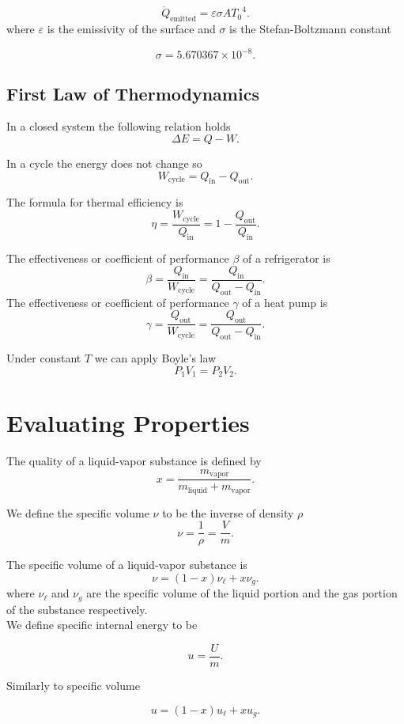 \documentclass{report}
\begin{document}
\[
	\dot{Q}_\text{emitted} = \varepsilon\sigma A{T_0}^4
	.\]
where $\varepsilon$ is the emissivity of the surface and $\sigma$ is the Stefan-Boltzmann constant

\[
	\sigma = 5.670367 \times 10^{−8}
	.\]

\section{First Law of Thermodynamics}

In a closed system the following relation holds
\[
	\Delta E = Q - W
	.\]

In a cycle the energy does not change so
\[
	W_\text{cycle} = Q_\text{in} - Q_\text{out}
	.\]

The formula for thermal efficiency is
\[
	\eta = \frac{W_\text{cycle}}{Q_\text{in}} = 1-\frac{Q_\text{out}}{Q_\text{in}}
	.\]

The effectiveness or coefficient of performance $\beta$ of a refrigerator is
\[
	\beta = \frac{Q_\text{in}}{W_\text{cycle}} = \frac{Q_\text{in}}{Q_\text{out} - Q_\text{in}}
	.\]
The effectiveness or coefficient of performance $\gamma$ of a heat pump is
\[
	\gamma = \frac{Q_\text{out}}{W_\text{cycle}} = \frac{Q_\text{out}}{Q_\text{out} - Q_\text{in}}
	.\]

Under constant $T$ we can apply Boyle's law
\[
	P_1V_1 = P_2V_2
	.\]

\chapter{Evaluating Properties} %

The quality of a liquid-vapor substance is defined by
\[
	x=\frac{m_\text{vapor}}{m_\text{liquid} + m_\text{vapor}}
	.\]

We define the specific volume $\nu$ to be the inverse of density $\rho$
\[
	\nu = \frac{1}{\rho}=\frac{V}{m}
	.\]

The specific volume of a liquid-vapor substance is
\[
	\nu = (1-x)\nu_\ell + x\nu_g
	.\]
where $\nu_\ell$ and $\nu_g$ are the specific volume of the liquid portion and the gas portion of the substance respectively.\\

We define specific internal energy to be

\[
	u = \frac{U}{m}
	.\]

Similarly to specific volume

\[
	u = (1-x)u_\ell + xu_g
	.\]
\end{document}
